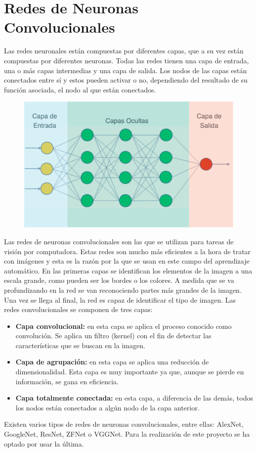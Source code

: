 \documentclass[12pt]{report} %
\begin{document}
	\section{Redes de Neuronas Convolucionales}
	Las redes neuronales están compuestas por diferentes capas, que a su vez están compuestas por diferentes neuronas. Todas las redes
	tienen una capa de entrada, una o más capas intermedias y una capa de salida. Los nodos de las capas están conectados entre sí
	y estos pueden activar o no, dependiendo del resultado de su función asociada, el nodo al que están conectados. 
	\begin{figure}[H]
		{\includegraphics[scale=0.3]{red-neuronal.png}}
	\end{figure}
	Las redes de neuronas convolucionales son las que se utilizan para tareas de visión por computadora. Estas redes son mucho más eficientes
	a la hora de tratar con imágenes y esta es la razón por la que se usan en este campo del aprendizaje automático. En las primeras capas
	se identifican los elementos de la imagen a una escala grande, como pueden ser los bordes o los colores. A medida que se va profundizando
	en la red se van reconociendo partes más grandes de la imagen. Una vez se llega al final, la red es capaz de identificar el tipo de imagen. 
	Las redes convolucionales se componen de tres capas:
	\begin{itemize}
		\item \textbf{Capa convolucional:} en esta capa se aplica el proceso conocido como convolución. Se aplica un filtro (kernel)
		con el fin de detectar las características que se buscan en la imagen. 
		\item \textbf{Capa de agrupación:} en esta capa se aplica una reducción de dimensionalidad. Esta capa es muy importante ya que, aunque se
		pierde en  información, se gana en eficiencia.
		\item \textbf{Capa totalmente conectada:} en esta capa, a diferencia de las demás, todos los nodos están conectados a algún nodo
		de la capa anterior. 
	\end{itemize}
	Existen varios tipos de redes de neuronas convolucionales, entre ellas: AlexNet, GoogleNet, ResNet, ZFNet o VGGNet.
	Para la realización de este proyecto se ha optado por usar la última.
\end{document}
